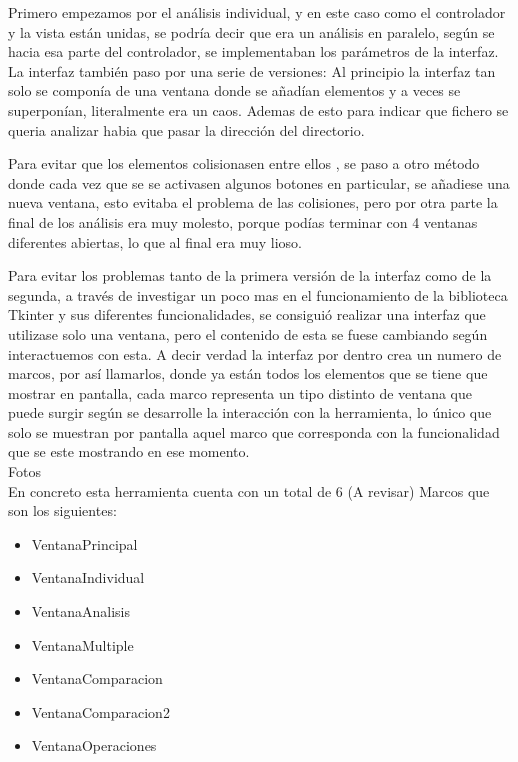 Primero  empezamos por el análisis individual, y en este caso como el controlador y la vista están unidas, se podría  decir que era un análisis en paralelo, según se hacia esa parte del controlador, se implementaban los parámetros de la interfaz.\\

La interfaz también paso por una serie de versiones:
 Al principio la interfaz tan solo se componía de una ventana donde se añadían elementos  y a veces se  superponían, literalmente era un caos. Ademas de esto para indicar que fichero se queria analizar habia que pasar la dirección del directorio.\\
 

Para evitar que los elementos colisionasen entre ellos , se paso a otro  método donde cada vez que se se activasen algunos botones en particular, se añadiese una nueva ventana, esto  evitaba el problema de las colisiones, pero por otra parte la final de los análisis era muy molesto, porque  podías terminar con 4 ventanas diferentes abiertas, lo que al final era muy lioso.\\



Para evitar los problemas tanto de la primera versión de la interfaz como de la segunda, a través de investigar un poco mas en el funcionamiento de la biblioteca Tkinter y sus diferentes funcionalidades, se consiguió realizar una interfaz que utilizase solo  una ventana, pero  el contenido  de esta se  fuese cambiando según interactuemos con esta. A decir verdad la interfaz por dentro crea un numero de  marcos, por así llamarlos, donde ya están todos los elementos que se tiene que mostrar en pantalla, cada marco representa un tipo distinto de ventana que puede surgir según se desarrolle la interacción con la herramienta, lo único que solo se muestran por pantalla aquel marco que corresponda con la funcionalidad que se este mostrando en ese momento.\\

Fotos\\

En concreto esta herramienta cuenta con un total de 6 (A revisar) Marcos que son los siguientes:\\
\begin{itemize}
	\item VentanaPrincipal
	\item VentanaIndividual
	\item VentanaAnalisis
	\item VentanaMultiple
	\item VentanaComparacion
	\item VentanaComparacion2
	\item VentanaOperaciones
\end{itemize}



